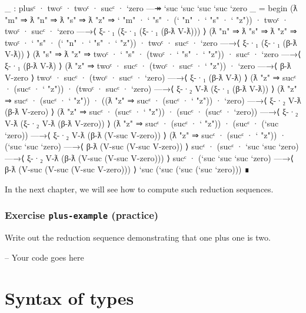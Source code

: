 \begin{fence}
\begin{code}
_ : plusᶜ · twoᶜ · twoᶜ · sucᶜ · `zero —↠ `suc `suc `suc `suc `zero
_ =
  begin
    (ƛ "m" ⇒ ƛ "n" ⇒ ƛ "s" ⇒ ƛ "z" ⇒ ` "m" · ` "s" · (` "n" · ` "s" · ` "z"))
      · twoᶜ · twoᶜ · sucᶜ · `zero
  —→⟨ ξ-·₁ (ξ-·₁ (ξ-·₁ (β-ƛ V-ƛ))) ⟩
    (ƛ "n" ⇒ ƛ "s" ⇒ ƛ "z" ⇒ twoᶜ · ` "s" · (` "n" · ` "s" · ` "z"))
      · twoᶜ · sucᶜ · `zero
  —→⟨ ξ-·₁ (ξ-·₁ (β-ƛ V-ƛ)) ⟩
    (ƛ "s" ⇒ ƛ "z" ⇒ twoᶜ · ` "s" · (twoᶜ · ` "s" · ` "z")) · sucᶜ · `zero
  —→⟨ ξ-·₁ (β-ƛ V-ƛ) ⟩
    (ƛ "z" ⇒ twoᶜ · sucᶜ · (twoᶜ · sucᶜ · ` "z")) · `zero
  —→⟨ β-ƛ V-zero ⟩
    twoᶜ · sucᶜ · (twoᶜ · sucᶜ · `zero)
  —→⟨ ξ-·₁ (β-ƛ V-ƛ) ⟩
    (ƛ "z" ⇒ sucᶜ · (sucᶜ · ` "z")) · (twoᶜ · sucᶜ · `zero)
  —→⟨ ξ-·₂ V-ƛ (ξ-·₁ (β-ƛ V-ƛ)) ⟩
    (ƛ "z" ⇒ sucᶜ · (sucᶜ · ` "z")) · ((ƛ "z" ⇒ sucᶜ · (sucᶜ · ` "z")) · `zero)
  —→⟨ ξ-·₂ V-ƛ (β-ƛ V-zero) ⟩
    (ƛ "z" ⇒ sucᶜ · (sucᶜ · ` "z")) · (sucᶜ · (sucᶜ · `zero))
  —→⟨ ξ-·₂ V-ƛ (ξ-·₂ V-ƛ (β-ƛ V-zero)) ⟩
    (ƛ "z" ⇒ sucᶜ · (sucᶜ · ` "z")) · (sucᶜ · (`suc `zero))
  —→⟨ ξ-·₂ V-ƛ (β-ƛ (V-suc V-zero)) ⟩
    (ƛ "z" ⇒ sucᶜ · (sucᶜ · ` "z")) · (`suc `suc `zero)
  —→⟨ β-ƛ (V-suc (V-suc V-zero)) ⟩
    sucᶜ · (sucᶜ · `suc `suc `zero)
  —→⟨ ξ-·₂ V-ƛ (β-ƛ (V-suc (V-suc V-zero))) ⟩
    sucᶜ · (`suc `suc `suc `zero)
  —→⟨ β-ƛ (V-suc (V-suc (V-suc V-zero))) ⟩
   `suc (`suc (`suc (`suc `zero)))
  ∎
\end{code}
\end{fence}

In the next chapter, we will see how to compute such reduction
sequences.

\hypertarget{exercise-plus-example-practice}{%
\subsubsection{\texorpdfstring{Exercise \texttt{plus-example}
(practice)}{Exercise plus-example (practice)}}\label{exercise-plus-example-practice}}

Write out the reduction sequence demonstrating that one plus one is two.

\begin{fence}
\begin{code}
-- Your code goes here
\end{code}
\end{fence}

\hypertarget{syntax-of-types}{%
\section{Syntax of types}\label{syntax-of-types}}

